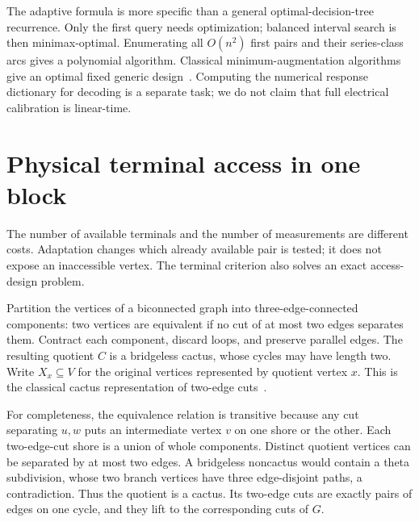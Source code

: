 \documentclass[11pt,letterpaper]{article}
\begin{document}
The adaptive formula is more specific than a general optimal-decision-tree recurrence. Only the first query needs optimization; balanced interval search is then minimax-optimal. Enumerating all $O(n^2)$ first pairs and their series-class arcs gives a polynomial algorithm. Classical minimum-augmentation algorithms give an optimal fixed generic design~\cite{WY}. Computing the numerical response dictionary for decoding is a separate task; we do not claim that full electrical calibration is linear-time.

\section{Physical terminal access in one block}\label{sec:access}
The number of available terminals and the number of measurements are different costs. Adaptation changes which already available pair is tested; it does not expose an inaccessible vertex. The terminal criterion also solves an exact access-design problem.

Partition the vertices of a biconnected graph into three-edge-connected components: two vertices are equivalent if no cut of at most two edges separates them. Contract each component, discard loops, and preserve parallel edges. The resulting quotient $C$ is a bridgeless cactus, whose cycles may have length two. Write $X_x\subseteq V$ for the original vertices represented by quotient vertex $x$. This is the classical cactus representation of two-edge cuts~\cite{MNS}.

For completeness, the equivalence relation is transitive because any cut separating $u,w$ puts an intermediate vertex $v$ on one shore or the other. Each two-edge-cut shore is a union of whole components. Distinct quotient vertices can be separated by at most two edges. A bridgeless noncactus would contain a theta subdivision, whose two branch vertices have three edge-disjoint paths, a contradiction. Thus the quotient is a cactus. Its two-edge cuts are exactly pairs of edges on one cycle, and they lift to the corresponding cuts of $G$.
\end{document}
